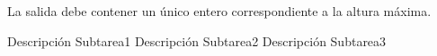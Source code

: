 \documentclass{oci}
\begin{document}
\begin{outputDescription}
La salida debe contener un único entero correspondiente a la altura máxima.
\end{outputDescription}

\begin{scoreDescription}
  Descripción Subtarea1
  Descripción Subtarea2
  Descripción Subtarea3
\end{scoreDescription}

\begin{sampleDescription}
\end{sampleDescription}
\end{document}
